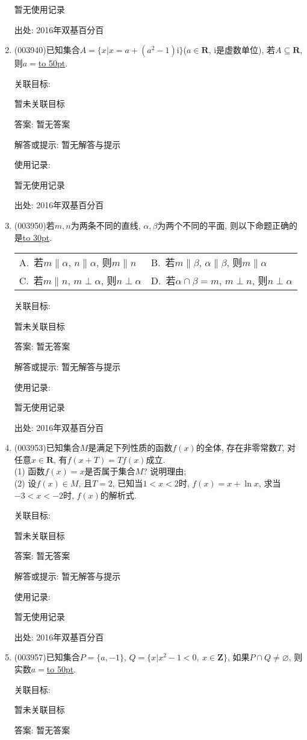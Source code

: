\documentclass[10pt,a4paper]{article}
\newcommand{\blank}[1]{\underline{\hbox to #1pt{}}}
\newcommand{\twoch}[4]{\par\begin{tabular}{p{.46\textwidth}p{.46\textwidth}}
A.~#1& B.~#2\\
C.~#3& D.~#4
\end{tabular}}
\begin{document}
\begin{enumerate}[1.]
暂无使用记录


出处: 2016年双基百分百
\item { (003940)}已知集合$A=\{x|x=a+(a^2-1)\mathrm{i}\}$($a\in \mathbf{R}$, $\mathrm{i}$是虚数单位), 若$A\subseteq \mathbf{R}$, 则$a=$\blank{50}.


关联目标:

暂未关联目标

答案: 暂无答案

解答或提示: 暂无解答与提示

使用记录:

暂无使用记录


出处: 2016年双基百分百
\item { (003950)}若$m,n$为两条不同的直线, $\alpha,\beta$为两个不同的平面, 则以下命题正确的是\blank{30}.
\twoch{若$m\parallel \alpha$, $n\parallel\alpha$, 则$m\parallel n$}{若$m\parallel \beta$, $\alpha\parallel\beta$, 则$m\parallel\alpha$}{若$m\parallel n$, $m\perp \alpha$, 则$n\perp \alpha$}{若$\alpha\cap\beta=m$, $m\perp n$, 则$n\perp\alpha$}


关联目标:

暂未关联目标

答案: 暂无答案

解答或提示: 暂无解答与提示

使用记录:

暂无使用记录


出处: 2016年双基百分百
\item { (003953)}已知集合$M$是满足下列性质的函数$f(x)$的全体, 存在非零常数$T$, 对任意$x\in \mathbf{R}$, 有$f(x+T)=Tf(x)$成立.\\
(1) 函数$f(x)=x$是否属于集合$M$? 说明理由;\\
(2) 设$f(x)\in M$, 且$T=2$, 已知当$1<x<2$时, $f(x)=x+\ln x$, 求当$-3<x<-2$时, $f(x)$的解析式.


关联目标:

暂未关联目标

答案: 暂无答案

解答或提示: 暂无解答与提示

使用记录:

暂无使用记录


出处: 2016年双基百分百
\item { (003957)}已知集合$P=\{a,-1\}$, $Q=\{x|x^2-1<0, \ x\in \mathbf{Z}\}$, 如果$P\cap Q\ne\varnothing$, 则实数$a=$\blank{50}.


关联目标:

暂未关联目标

答案: 暂无答案


\end{enumerate}
\end{document}
